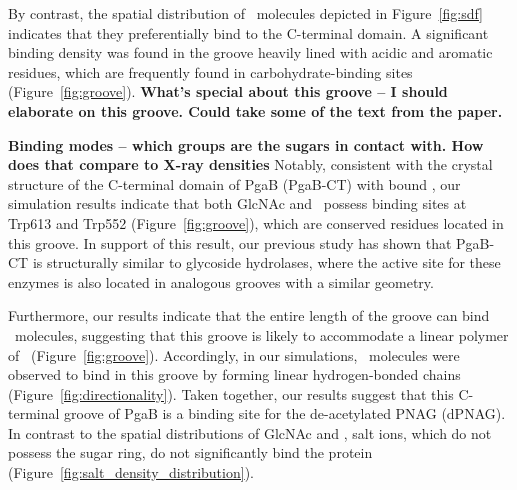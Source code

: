 


By contrast, the spatial distribution of \glucosamine\ molecules depicted in Figure~\ref{fig:sdf} indicates that they preferentially bind to the C-terminal domain. A significant binding density was found in the groove heavily lined with acidic and aromatic residues, which are frequently found in carbohydrate-binding sites (Figure~\ref{fig:groove}). \textbf{What's special about this groove -- I should elaborate on this groove. Could take some of the text from the paper.} 

\textbf{Binding modes -- which groups are the sugars in contact with. How does that compare to X-ray densities} Notably, consistent with the crystal structure of the C-terminal domain of PgaB (PgaB-CT) with bound \glucosamine, our simulation results indicate that both GlcNAc and \glucosamine\ possess binding sites at Trp613 and Trp552 (Figure~\ref{fig:groove}), which are conserved residues located in this groove.\cite{Little:2012dp}
In support of this result, our previous study has shown that PgaB-CT is structurally similar to glycoside hydrolases,\cite{Little:2012dp} where the active site for these enzymes is also located in analogous grooves with a similar geometry. 

Furthermore, our results indicate that the entire length of the groove can bind \glucosamine\ molecules, suggesting that this groove is likely to accommodate a linear polymer of \glucosamine\ (Figure~\ref{fig:groove}). Accordingly, in our simulations, \glucosamine\ molecules were observed to bind in this groove by forming linear hydrogen-bonded chains (Figure~\ref{fig:directionality}). Taken together, our results suggest that this C-terminal groove of PgaB is a binding site for the de-acetylated PNAG (dPNAG). In contrast to the spatial distributions of GlcNAc and \glucosamine, salt ions, which do not possess the sugar ring, do not significantly bind the protein (Figure~\ref{fig:salt_density_distribution}).

